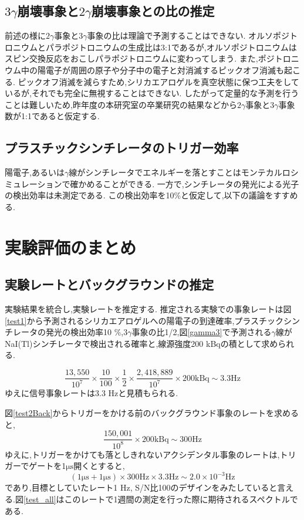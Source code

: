 \subsection{$3\gamma$崩壊事象と$2\gamma$崩壊事象との比の推定}
前述の様に$2\gamma$事象と$3\gamma$事象の比は理論で予測することはできない.
オルソポジトロニウムとパラポジトロニウムの生成比は3:1であるが,オルソポジトロニウムはスピン交換反応をおこしパラポジトロニウムに変わってしまう.
また,ポジトロニウム中の陽電子が周囲の原子や分子中の電子と対消滅するピックオフ消滅も起こる.
ピックオフ消滅を減らすため,シリカエアロゲルを真空状態に保つ工夫をしているが,それでも完全に無視することはできない.
したがって定量的な予測を行うことは難しいため,昨年度の本研究室の卒業研究の結果\cite{卒業論文2015}などから$2\gamma$事象と$3\gamma$事象数が1:1であると仮定する.


\subsection{プラスチックシンチレータのトリガー効率}
陽電子,あるいは$\gamma$線がシンチレータでエネルギーを落とすことはモンテカルロシミュレーションで確かめることができる.
一方で,シンチレータの発光による光子の検出効率は未測定である.
この検出効率を10\%と仮定して,以下の議論をすすめる.

\section{実験評価のまとめ}
\label{section_testall}

\subsection{実験レートとバックグラウンドの推定}
実験結果を統合し,実験レートを推定する.
推定される実験での事象レートは図\ref{test1}から予測されるシリカエアロゲルへの陽電子の到達確率,プラスチックシンチレータの発光の検出効率10 \%,$3\gamma$事象の比1/2,図\ref{gamma3}で予測される$\gamma$線がNaI(Tl)シンチレータで検出される確率と,線源強度200 kBqの積として求められる.

\begin{equation}
	\nonumber
	\frac{13,550}{10^7} \times \frac{10}{100} \times \frac{1}{2} \times \frac{2,418,889}{10^7} \times 200 \mathrm{kBq} \sim 3.3 \mathrm{Hz}
\end{equation}
ゆえに信号事象レートは3.3 Hzと見積もられる.

図\ref{test2Back}からトリガーをかける前のバックグラウンド事象のレートを求めると,
\begin{equation}
	\nonumber
	\frac{150,001}{10^8} \times 200 \mathrm{kBq} \sim 300 \mathrm{ Hz}
\end{equation}
ゆえに,トリガーをかけても落としきれないアクシデンタル事象のレートは,トリガーでゲートを1$\si{\micro \second}$開くとすると,
\begin{equation}
	\nonumber
	( 1 \si{\micro \second} + 1 \si{\micro \second}) \times  300 \mathrm{Hz} \times 3.3 \mathrm{Hz} \sim 2.0 \times 10^{-3} \mathrm{Hz}
\end{equation}
であり,目標としていたレート1 Hz, S/N比100のデザインをみたしていると言える.図\ref{test_all}はこのレートで1週間の測定を行った際に期待されるスペクトルである.

